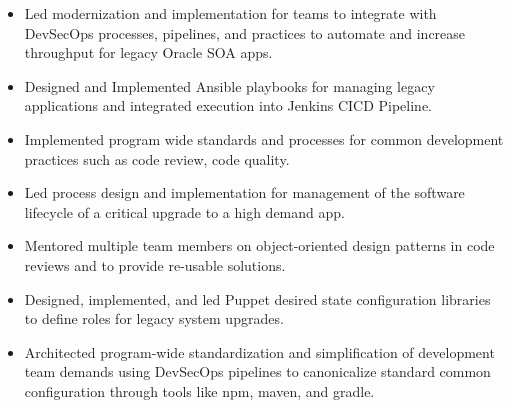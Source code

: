 \documentclass[12pt, line, margin]{res}
\begin{document}
\begin{resume}
\begin{itemize}
              \item   Led modernization and implementation for teams to integrate   
                          with DevSecOps processes, pipelines, and practices to automate 
                          and increase throughput for legacy Oracle SOA apps.
              \item   Designed and Implemented Ansible playbooks for managing legacy
                          applications and integrated execution into Jenkins CICD Pipeline.
              \item   Implemented program wide standards and processes for common 
                          development practices such as code review, code quality.
              \item   Led process design and implementation for management of the 
                          software lifecycle of a critical upgrade to a high demand app.
              \item   Mentored multiple team members on object-oriented design \newline 
                          patterns in code reviews and to provide re-usable solutions.
              \item   Designed, implemented, and led Puppet desired state \newline
                          configuration libraries to define roles for legacy system upgrades.
              \item   Architected program-wide standardization and simplification of  
                          development team demands using DevSecOps pipelines to \newline
                          canonicalize standard common configuration through tools like npm, maven, and gradle.
            \end{itemize}


\end{resume}
\end{document}
